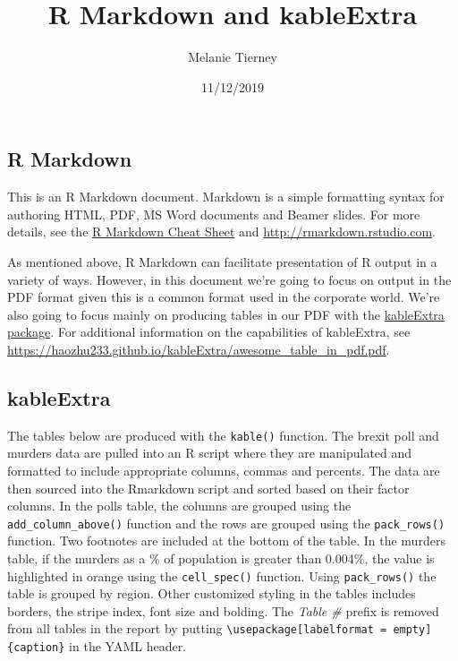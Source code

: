 \documentclass[]{article}
\title{R Markdown and kableExtra}
\author{Melanie Tierney}
\date{11/12/2019}
\begin{document}
\maketitle

\hypertarget{r-markdown}{%
\subsection{R Markdown}\label{r-markdown}}

This is an R Markdown document. Markdown is a simple formatting syntax
for authoring HTML, PDF, MS Word documents and Beamer slides. For more
details, see the
\href{https://rstudio.com/wp-content/uploads/2016/03/rmarkdown-cheatsheet-2.0.pdf}{R
Markdown Cheat Sheet} and \url{http://rmarkdown.rstudio.com}.

As mentioned above, R Markdown can facilitate presentation of R output
in a variety of ways. However, in this document we're going to focus on
output in the PDF format given this is a common format used in the
corporate world. We're also going to focus mainly on producing tables in
our PDF with the
\href{https://www.rdocumentation.org/packages/kableExtra/versions/1.1.0}{kableExtra
package}. For additional information on the capabilities of kableExtra,
see
\url{https://haozhu233.github.io/kableExtra/awesome_table_in_pdf.pdf}.

\hypertarget{kableextra}{%
\subsection{kableExtra}\label{kableextra}}

The tables below are produced with the \texttt{kable()} function. The
brexit poll and murders data are pulled into an R script where they are
manipulated and formatted to include appropriate columns, commas and
percents. The data are then sourced into the Rmarkdown script and sorted
based on their factor columns. In the polls table, the columns are
grouped using the \texttt{add\_column\_above()} function and the rows
are grouped using the \texttt{pack\_rows()} function. Two footnotes are
included at the bottom of the table. In the murders table, if the
murders as a \% of population is greater than 0.004\%, the value is
highlighted in orange using the \texttt{cell\_spec()} function. Using
\texttt{pack\_rows()} the table is grouped by region. Other customized
styling in the tables includes borders, the stripe index, font size and
bolding. The \emph{Table \#} prefix is removed from all tables in the
report by putting
\texttt{\textbackslash{}usepackage{[}labelformat\ =\ empty{]}\{caption\}}
in the YAML header.
\end{document}
